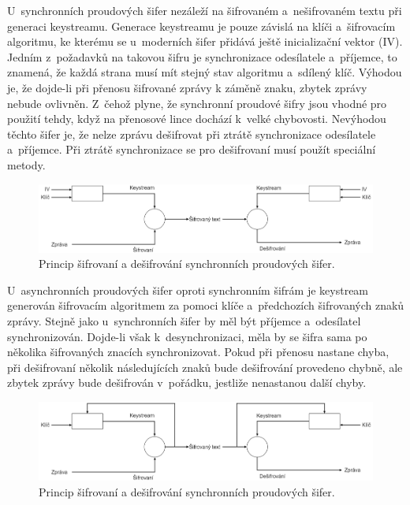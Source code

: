 U~synchronních proudových šifer nezáleží na šifrovaném a~nešifrovaném textu při generaci keystreamu. Generace keystreamu je pouze závislá na klíči a~šifrovacím algoritmu, ke kterému se u~moderních šifer přidává ještě inicializační vektor (IV).\cite{EncyclopediaSynchronous} Jedním z~požadavků na takovou šifru je synchronizace odesílatele a~příjemce, to znamená, že každá strana musí mít stejný stav algoritmu a~sdílený klíč. Výhodou je, že dojde-li při přenosu šifrované zprávy k záměně znaku, zbytek zprávy nebude ovlivněn. Z~čehož plyne, že synchronní proudové šifry jsou vhodné pro použití tehdy, když na přenosové lince dochází k~velké chybovosti. Nevýhodou těchto šifer je, že nelze zprávu dešifrovat při ztrátě synchronizace odesílatele a~příjemce. Při ztrátě synchronizace se pro dešifrovaní musí použít speciální metody. \cite{HavlicekBakalarka}
\begin{figure}[!h]
  \begin{center}
    \includegraphics[scale=0.3]{obrazky/synchronousCipher.png}
  \end{center}
  \caption[Synchronní proudová šifra]{Princip šifrovaní a dešifrování synchronních proudových šifer.\cite{EncyclopediaSynchronous}}
  \label{img:synchoronstream}
\end{figure}

U~asynchronních proudových šifer oproti synchronním šifrám je keystream generován šifrovacím algoritmem za pomoci klíče a~předchozích šifrovaných znaků zprávy. Stejně jako u~synchronních šifer by měl být příjemce a~odesílatel synchronizován. Dojde-li však k~desynchronizaci, měla by se šifra sama po několika šifrovaných znacích synchronizovat. Pokud při přenosu nastane chyba, při dešifrovaní několik následujících znaků bude dešifrování provedeno chybně, ale zbytek zprávy bude dešifrován v~pořádku, jestliže nenastanou další chyby.\cite{HavlicekBakalarka} %
\begin{figure}[!h]
  \begin{center}
    \includegraphics[scale=0.3]{obrazky/asynchronousCipher.png}
  \end{center}
  \caption[Asynchronní proudová šifra]{Princip šifrovaní a dešifrování synchronních proudových šifer.\cite{EncyclopediaAsynchronous}}
  \label{img:asynchronstream}
\end{figure}
